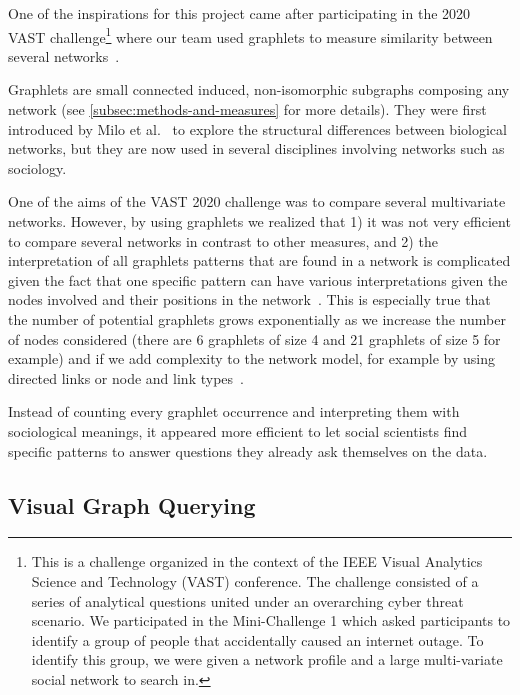 One of the inspirations for this project came after participating in the 2020 VAST challenge\footnote{This is a challenge organized in the context of the IEEE Visual Analytics Science and Technology (VAST) conference. The challenge consisted of a series of analytical questions united under an overarching cyber threat scenario. We participated in the Mini-Challenge 1 which asked participants to identify a group of people that accidentally caused an internet outage. To identify this group, we were given a network profile and a large multi-variate social network to search in.} where our team used graphlets to measure similarity between several networks~\cite{tovanichVAST2020Contest2021}.

Graphlets are small connected induced, non-isomorphic subgraphs composing any network (see \autoref{subsec:methods-and-measures} for more details).
They were first introduced by Milo et al.~\cite{miloNetworkMotifsSimple2002} to explore the structural differences between biological networks, but they are now used in several disciplines involving networks such as sociology\cite{charbeyStarsHolesPaths2019}.

One of the aims of the VAST 2020 challenge was to compare several multivariate networks.
However, by using graphlets we realized that 1) it was not very efficient to compare several networks in contrast to other measures, and 2) the interpretation of all graphlets patterns that are found in a network is complicated given the fact that one specific pattern can have various interpretations given the nodes involved and their positions in the network~\cite{ingramNetworkMotifsStructure2006}.
This is especially true that the number of potential graphlets grows exponentially as we increase the number of nodes considered (there are 6 graphlets of size 4 and 21 graphlets of size 5 for example) and if we add complexity to the network model, for example by using directed links or node and link types~\cite{ribeiroDiscoveringColoredNetwork2014}.

Instead of counting every graphlet occurrence and interpreting them with sociological meanings, it appeared more efficient to let social scientists find specific patterns to answer questions they already ask themselves on the data.


\subsection{Visual Graph Querying}


